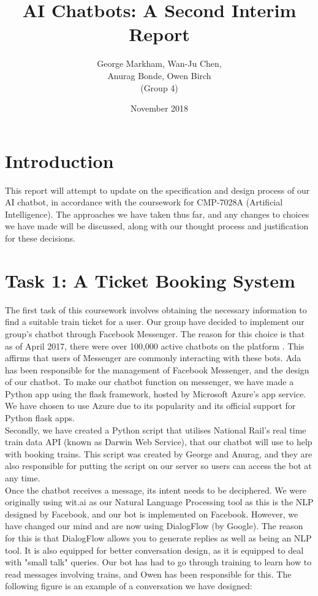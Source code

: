 \documentclass[12pt,a4paper]{article}
\title{AI Chatbots: A Second Interim Report}
\author{George Markham, Wan-Ju Chen, \\ Anurag Bonde, Owen Birch \\ (Group 4)} %
\date{November 2018}
\begin{document}
    \maketitle

    \section*{Introduction}
    
    This report will attempt to update on the specification and design process of our AI chatbot, in accordance with the coursework for CMP-7028A (Artificial Intelligence). The approaches we have taken thus far, and any changes to choices we have made will be discussed, along with our thought process and justification for these decisions.
    
    \section*{Task 1: A Ticket Booking System}
    The first task of this coursework involves obtaining the necessary information to find a suitable train ticket for a user. Our group have decided to implement our group's chatbot through Facebook Messenger. The reason for this choice is that as of April 2017, there were over 100,000 active chatbots on the platform \citep{Parr17}. This affirms that users of Messenger are commonly interacting with these bots. Ada has been responsible for the management of Facebook Messenger, and the design of our chatbot. To make our chatbot function on messenger, we have made a Python app using the flask framework, hosted by Microsoft Azure's app service. We have chosen to use Azure due to its popularity and its official support for Python flask apps.  \\
    
    Secondly, we have created a Python script that utilises National Rail's real time train data API (known as Darwin Web Service), that our chatbot will use to help with booking trains. This script was created by George and Anurag, and they are also responsible for putting the script on our server so users can access the bot at any time. \\
    
    Once the chatbot receives a message, its intent needs to be deciphered. We were originally using wit.ai as our Natural Language Processing tool as this is the NLP designed by Facebook, and our bot is implemented on Facebook. However, we have changed our mind and are now using DialogFlow (by Google). The reason for this is that DialogFlow allows you to generate replies as well as being an NLP tool. It is also equipped for better conversation design, as it is equipped to deal with "small talk" queries. Our bot has had to go through training to learn how to read messages involving trains, and Owen has been responsible for this. The following figure is an example of a conversation we have designed:
    
\end{document}
